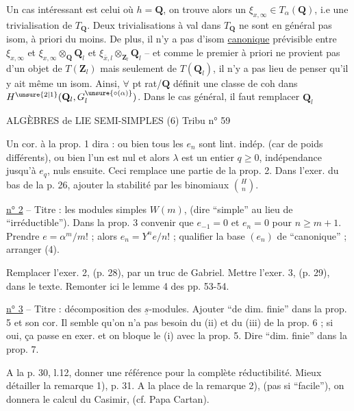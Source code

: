Un cas intéressant est celui où $h=\mathbf Q$, on trouve alors un  $\xi_{x,\infty}\in T_\alpha(\mathbf Q)$, i.e une trivialisation de $T_{\mathbf Q}$. Deux trivialisations à val dans $T_{\mathbf Q}$ ne sont en général pas isom, à priori du moins. De plus, il n'y a pas d'isom \uline{canonique} prévisible entre $\xi_{x,\infty}$ et $\xi_{x,\infty}\otimes_{\mathbf Q}\mathbf Q_l$ et $\xi_{\bar x,l}\otimes_{\mathbf Z_l}\mathbf Q_l$ --  et comme le premier à priori ne provient pas d'un objet de $T(\mathbf Z_l)$ mais seulement de $T(\mathbf Q_l)$, il n'y a pas lieu de penser qu'il y ait même un isom. Ainsi, $\forall$ pt rat/$\mathbf Q$ définit une classe de coh dans $H^{\unsure{2|1}}(\mathbf Q_l,G_l^{\unsure{\circ(\alpha)}})$. Dans le cas général, il faut remplacer $\mathbf Q_l$




ALGÈBRES de LIE SEMI-SIMPLES (6) \hfill Tribu n° 59

Un cor. à la prop. 1 dira : ou bien tous les $e_n$ sont lint. indép. (car de poids différents), ou bien l'un est nul et alors $\lambda$ est un entier $q\geq 0$, indépendance jusqu'à $e_q$, nuls ensuite. Ceci remplace une partie de la prop. 2. Dans l'exer. du bas de la p. 26, ajouter la stabilité par les binomiaux $\binom{H}{n}$.

\uline{n° 2} -- Titre : les modules simples $W(m)$, (dire ``simple'' au lieu de ``irréductible''). Dans la prop. 3 convenir que $e_{-1}=0$ et $e_n=0$ pour $n\geq m+1$. Prendre $e=\alpha^m/m!$ ; alors $e_n=Y^ne/n!$ ; qualifier la base $(e_n)$ de ``canonique'' ; arranger (4).

Remplacer l'exer. 2, (p. 28), par un truc de Gabriel. Mettre l'exer. 3, (p. 29), dans le texte. Remonter ici le lemme 4 des pp. 53-54.

\uline{n° 3} -- Titre : décomposition des $\underline{s}$-modules. Ajouter ``de dim. finie'' dans la prop. 5 et son cor. Il semble qu'on n'a pas besoin du (ii) et du (iii) de la prop. 6 ; si oui, ça passe en exer. et on bloque le (i) avec la prop. 5. Dire ``dim. finie'' dans la prop. 7.

A la p. 30, l.12, donner une référence pour la complète réductibilité. Mieux détailler la remarque 1), p. 31. A la place de la remarque 2), (pas si ``facile''), on donnera le calcul du Casimir, (cf. Papa Cartan).

